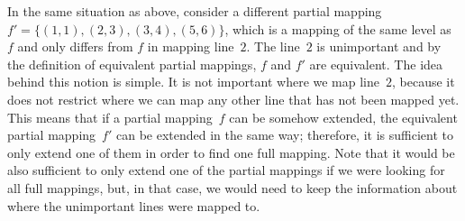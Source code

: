 In the same situation as above, consider a different partial mapping $f'=\{(1,1),(2,3),(3,4),(5,6)\}$, which is a mapping of the same level as $f$ and only differs from $f$ in mapping line~$2$. The line~$2$ is unimportant and by the definition of equivalent partial mappings, $f$ and $f'$ are equivalent. The idea behind this notion is simple. It is not important where we map line~$2$, because it does not restrict where we can map any other line that has not been mapped yet. This means that if a partial mapping~$f$ can be somehow extended, the equivalent partial mapping~$f'$ can be extended in the same way; therefore, it is sufficient to only extend one of them in order to find one full mapping. Note that it would be also sufficient to only extend one of the partial mappings if we were looking for all full mappings, but, in that case, we would need to keep the information about where the unimportant lines were mapped to.